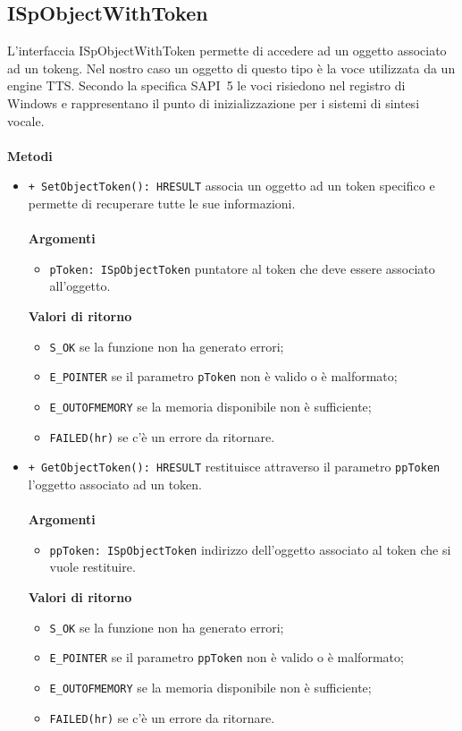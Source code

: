 \subsection{ISpObjectWithToken}
L'interfaccia ISpObjectWithToken permette di accedere ad un oggetto associato ad un \gls{tokeng}. Nel nostro caso un oggetto di questo tipo è la voce utilizzata da un engine TTS. Secondo la specifica SAPI~5 le voci risiedono nel registro di Windows e rappresentano il punto di inizializzazione per i sistemi di sintesi vocale. 
\\\\
\textbf{Metodi}
\begin{itemize}
	\item \texttt{+ SetObjectToken(): HRESULT} associa un oggetto ad un token specifico e permette di recuperare tutte le sue informazioni.
	\\\\
	\textbf{Argomenti}
	\begin{itemize}
		\item \texttt{pToken: ISpObjectToken} puntatore al token che deve essere associato all'oggetto.
	\end{itemize}
	\textbf{Valori di ritorno}
	\begin{itemize}
		\item \texttt{S\_OK} se la funzione non ha generato errori;
		\item \texttt{E\_POINTER} se il parametro \texttt{pToken} non è valido o è malformato;
		\item \texttt{E\_OUTOFMEMORY} se la memoria disponibile non è sufficiente;
		\item \texttt{FAILED(hr)} se c'è un errore da ritornare. 
	\end{itemize}
	
	\item \texttt{+ GetObjectToken(): HRESULT} restituisce attraverso il parametro \texttt{ppToken} l'oggetto associato ad un token.
	\\\\
	\textbf{Argomenti}
	\begin{itemize}
		\item \texttt{ppToken: ISpObjectToken} indirizzo dell'oggetto associato al token che si vuole restituire.
	\end{itemize}
	\textbf{Valori di ritorno}
	\begin{itemize}
		\item \texttt{S\_OK} se la funzione non ha generato errori;
		\item \texttt{E\_POINTER} se il parametro \texttt{ppToken} non è valido o è malformato;
		\item \texttt{E\_OUTOFMEMORY} se la memoria disponibile non è sufficiente;
		\item \texttt{FAILED(hr)} se c'è un errore da ritornare. 
	\end{itemize}
\end{itemize}


